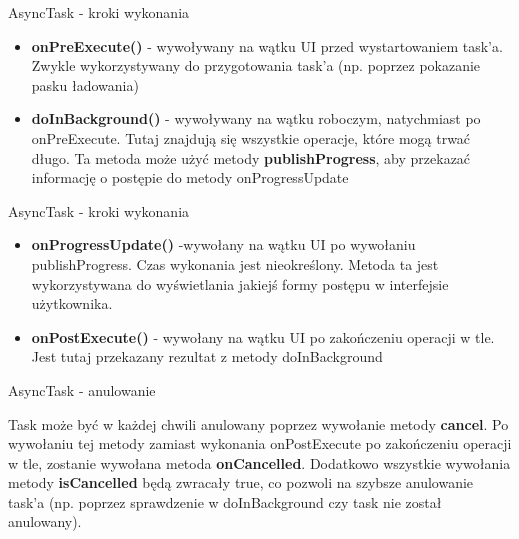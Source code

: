 \documentclass{beamer}
\begin{document}
\begin{frame}{AsyncTask - kroki wykonania}
	\begin{itemize}
		\item \textbf{onPreExecute()} - wywoływany na wątku UI przed wystartowaniem task'a. Zwykle wykorzystywany do przygotowania task'a (np. poprzez pokazanie pasku ładowania)
		\item \textbf{doInBackground()} - wywoływany na wątku roboczym, natychmiast po onPreExecute. Tutaj znajdują się wszystkie operacje, które mogą trwać długo. Ta metoda może użyć metody \textbf{publishProgress}, aby przekazać informację o postępie do metody onProgressUpdate
	\end{itemize}
\end{frame}

\begin{frame}{AsyncTask - kroki wykonania}
	\begin{itemize}
		\item \textbf{onProgressUpdate()} -wywołany na wątku UI po wywołaniu publishProgress. Czas wykonania jest nieokreślony. Metoda ta jest wykorzystywana do wyświetlania jakiejś formy postępu w interfejsie użytkownika.
		\item \textbf{onPostExecute()} - wywołany na wątku UI po zakończeniu operacji w tle. Jest tutaj przekazany rezultat z metody doInBackground
	\end{itemize}
\end{frame}

\begin{frame}{AsyncTask - anulowanie}
	\begin{block}{}
		Task może być w każdej chwili anulowany poprzez wywołanie metody \textbf{cancel}. Po wywołaniu tej metody zamiast wykonania onPostExecute po zakończeniu operacji w tle, zostanie wywołana metoda \textbf{onCancelled}. Dodatkowo wszystkie wywołania metody \textbf{isCancelled} będą zwracały true, co pozwoli na szybsze anulowanie task'a (np. poprzez sprawdzenie w doInBackground czy task nie został anulowany).
	\end{block}
\end{frame}
\end{document}
